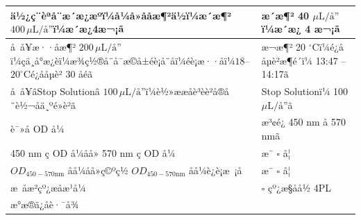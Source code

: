 \documentclass[UTF8,10pt,a4paper,fontset=fandol]{ctexart}
\newcommand{\fieldvalue}[1]{#1}
\newcommand{\handwritten}[1]{#1}
\begin{document}
\begin{tabularx}{\textwidth}{|p{}|X|}
\hline
ä½¿ç¨èªå¨æ´æ¿æºï¼å¼å»å­åæ¶²ä½ï¼æ´æ¶² $400\,\mu\mathrm{L}/å­$ï¼æ´æ¿4æ¬¡ã &
æ´æ¶²
\fieldvalue{\handwritten{40}} $\mu\mathrm{L}/å­$ï¼æ´æ¿
\fieldvalue{\handwritten{4}} æ¬¡ã\\
\hline
å å¥æ··åæ¶² $200\,\mu\mathrm{L}/å­$ï¼çä¸å°æ¿èï¼æ¾ç½®å¨å¯æ©å±éè¡å¨åï¼éè¡æ··åï¼$18$--$20^\circ\mathrm{C}$é¿åå­µè² $30$ åéã &
æ¬æ¶²
\fieldvalue{\handwritten{20}} $^\circ\mathrm{C}$ï¼é¿åå­µè²æ¶é´ï¼
\fieldvalue{\handwritten{13:47}} --
\fieldvalue{\handwritten{14:17}}ã\\
\hline
å å¥âStop Solutionâ $100\,\mu\mathrm{L}/å­$ï¼è½»ææåè³èè²å®å¨è½¬åä¸ºé»è²ã &
Stop Solutionï¼
\fieldvalue{\handwritten{100}} $\mu\mathrm{L}/å­$ã\\
\hline
è¯»å OD å¼ &
æ³¢é¿
\fieldvalue{\handwritten{450}} nm å
\fieldvalue{\handwritten{570}} nmã\\
\hline
450 nm ç OD å¼åå» 570 nm ç OD å¼ &
\fieldvalue{\handwritten{\checkmark}} æ¯ \quad $\square$ å¦\\
\hline
$OD_{450-570\mathrm{nm}}$ åå¼åå»ç©ºç½ $OD_{450-570\mathrm{nm}}$ åå¼è¿è¡æ ¡å &
\fieldvalue{\handwritten{\checkmark}} æ¯ \quad $\square$ å¦\\
\hline
æ åæ²çº¿æåæ¹å¼ &
$\square$ çº¿æ§åå½ \quad
\fieldvalue{\handwritten{\checkmark}} 4PL\\
\hline
æ°æ®ä¿å­è·¯å¾ &

\end{tabularx}
\end{document}
